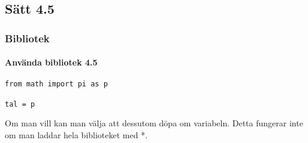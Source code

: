 \documentclass{beamer}
\begin{document}
\subsection{Sätt 4.5}

\begin{frame}[fragile]
	\frametitle{Bibliotek}
	\framesubtitle{Använda bibliotek 4.5}
	
	\begin{lstlisting}
from math import pi as p

tal = p
	\end{lstlisting}
	
	Om man vill kan man välja att dessutom döpa om variabeln. Detta fungerar inte om man laddar hela biblioteket med *.

\end{frame}
\end{document}
